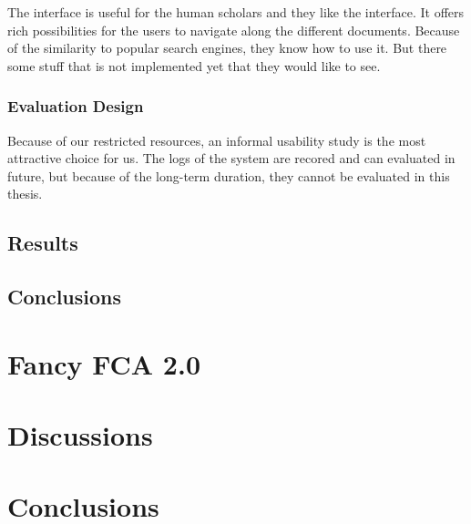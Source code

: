 \documentclass[11pt]{report}
\begin{document}
The interface is useful for the human scholars and they like the interface. It offers rich possibilities for the users to navigate along the different documents. Because of the similarity to popular search engines, they know how to use it. But there some stuff that is not implemented yet that they would like to see.

\subsection{Evaluation Design}

Because of our restricted resources, an informal usability study is the most attractive choice for us. The logs of the system are recored and can evaluated in future, but because of the long-term duration, they cannot be evaluated in this thesis.
\section{Results}

\section{Conclusions}

\chapter{Fancy FCA 2.0}

\blindtext

\chapter{Discussions}

\blindtext

\chapter{Conclusions}

\blindtext

\newpage




\listoffigures
\listoftables 
\end{document}
